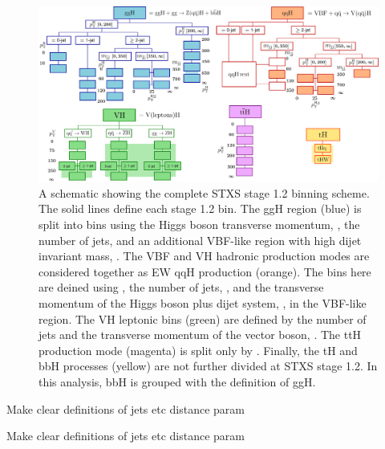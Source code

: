 \begin{landscape}
\begin{figure}[htbp]
  \centering
  \includegraphics[width=1\linewidth]{Figures/theory/allSTXSbins.pdf}
  \caption[STXS stage 1.2 binning scheme]
  {
    A schematic showing the complete STXS stage 1.2 binning scheme. The solid lines define each stage 1.2 bin. The ggH region (blue) is split into bins using the Higgs boson transverse momentum, \ptH, the number of jets, and an additional VBF-like region with high dijet invariant mass, \mjj. The VBF and VH hadronic production modes are considered together as EW qqH production (orange). The bins here are deined using \ptH, the number of jets, \mjj, and the transverse momentum of the Higgs boson plus dijet system, \ptHjj, in the VBF-like region. The VH leptonic bins (green) are defined by the number of jets and the transverse momentum of the vector boson, \ptV. The ttH production mode (magenta) is split only by \ptH. Finally, the tH and bbH processes (yellow) are not further divided at STXS stage 1.2. In this analysis, bbH is grouped with the definition of ggH.
  }
  \label{fig:stxs_schematic}
\end{figure}
\end{landscape}


\begin{table}[htb!]
    \caption[ggH STXS stage 1.2 definitions and fractions]{Make clear definitions of jets etc  distance param}
    \label{tab:ggH_definitions}
    \centering
    \scriptsize
    \renewcommand{\arraystretch}{1.2}
    \setlength{\tabcolsep}{5pt}
    \hspace*{-5cm}
    
    \hspace*{-5cm}
\end{table}

\begin{table}[htb!]
    \caption[qqH STXS stage 1.2 definitions and fractions]{Make clear definitions of jets etc distance param}
    \label{tab:qqH_definitions}
    \centering
    \scriptsize
    \renewcommand{\arraystretch}{1.2}
    \setlength{\tabcolsep}{5pt}
    \hspace*{-5cm}
    
    \hspace*{-5cm}
\end{table}

